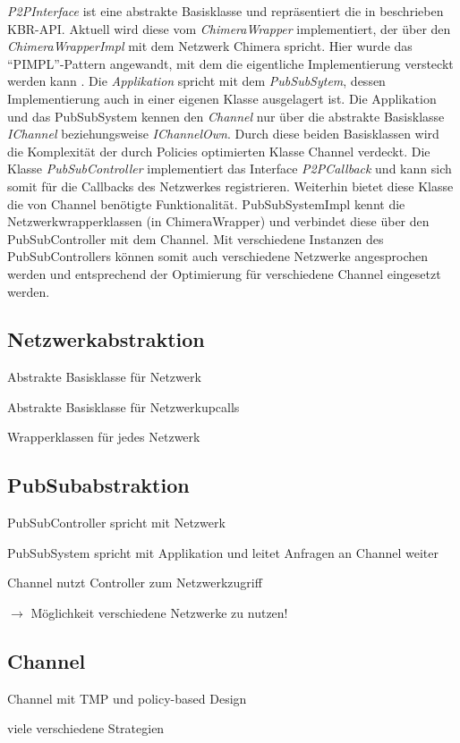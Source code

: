 \emph{P2PInterface} ist eine abstrakte Basisklasse und repräsentiert die in \cite{Dabek2003Towards} beschrieben KBR-API. Aktuell wird diese vom \emph{ChimeraWrapper} implementiert, der über den \emph{ChimeraWrapperImpl} mit dem Netzwerk Chimera spricht. Hier wurde das ``PIMPL''-Pattern angewandt, mit dem die eigentliche Implementierung versteckt werden kann \cite{Alexandrescu2001Modern}. Die \emph{Applikation} spricht mit dem \emph{PubSubSytem}, dessen Implementierung auch in einer eigenen Klasse ausgelagert ist. Die Applikation und das PubSubSystem kennen den \emph{Channel} nur über die abstrakte Basisklasse \emph{IChannel} beziehungsweise \emph{IChannelOwn}. Durch diese beiden Basisklassen wird die Komplexität der durch Policies optimierten Klasse Channel verdeckt. Die Klasse \emph{PubSubController} implementiert das Interface \emph{P2PCallback} und kann sich somit für die Callbacks des Netzwerkes registrieren. Weiterhin bietet diese Klasse die von Channel benötigte Funktionalität. PubSubSystemImpl kennt die Netzwerkwrapperklassen (in  ChimeraWrapper) und verbindet diese über den PubSubController mit dem Channel. Mit verschiedene Instanzen des PubSubControllers können somit auch verschiedene Netzwerke angesprochen werden und entsprechend der Optimierung für verschiedene Channel eingesetzt werden.

\subsection{Netzwerkabstraktion}
\begin{itemize*}
\item Abstrakte Basisklasse für Netzwerk
\item Abstrakte Basisklasse für Netzwerkupcalls
\item Wrapperklassen für jedes Netzwerk
\end{itemize*}


\subsection{PubSubabstraktion}
\begin{itemize*}
\item PubSubController spricht mit Netzwerk
\item PubSubSystem spricht mit Applikation und leitet Anfragen an Channel weiter
\item Channel nutzt Controller zum Netzwerkzugriff
\item $\rightarrow$ Möglichkeit verschiedene Netzwerke zu nutzen!
\end{itemize*}

\subsection{Channel}
\begin{itemize*}
\item Channel mit TMP und policy-based Design
\item viele verschiedene Strategien
\end{itemize*}


